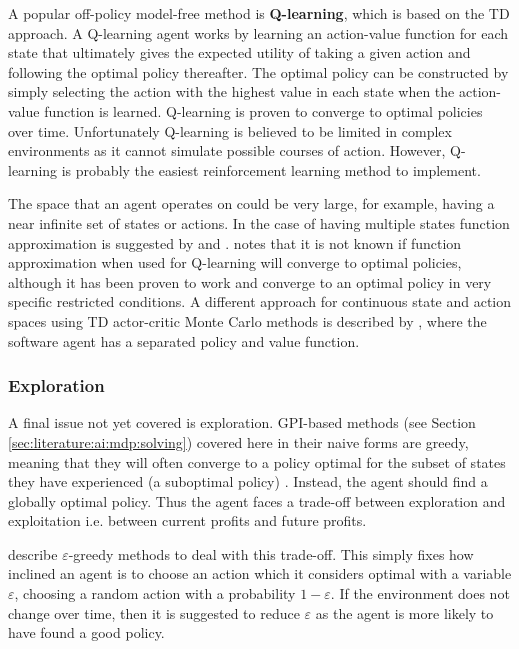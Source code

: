 A popular off-policy model-free method is \textbf{Q-learning}, which is based
on the TD approach. A Q-learning agent works by learning an action-value
function for each state that ultimately gives the expected utility of taking a
given action and following the optimal policy thereafter. The optimal policy
can be constructed by simply selecting the action with the highest value in
each state when the action-value function is learned. Q-learning is proven to
converge to optimal policies over time. Unfortunately Q-learning is believed to
be limited in complex environments as it cannot simulate possible courses of
action. However, Q-learning is probably the easiest reinforcement learning
method to implement. \parencite{Russell2010ai+modern}

The space that an agent operates on could be very large, for example, having a
near infinite set of states or actions. In the case of having multiple states
function approximation is suggested by \textcite{Sutton1998ai+reinforcement}
and \textcite{Russell2010ai+modern}. \textcite{Szepesvari2010ai+algorithms}
notes that it is not known if function approximation when used for Q-learning
will converge to optimal policies, although it has been proven to work and
converge to an optimal policy in very specific restricted conditions. A
different approach for continuous state and action spaces using TD actor-critic
Monte Carlo methods is described by \textcite{Lazaric2008ai+smc}, where the
software agent has a separated policy and value function.


\subsubsection{Exploration}
\label{sec:literature:ai:exploration}

A final issue not yet covered is exploration. GPI-based methods (see Section
\ref{sec:literature:ai:mdp:solving}) covered here in their naive forms are
greedy, meaning that they will often converge to a policy optimal for the
subset of states they have experienced (a suboptimal policy)
\parencite{Russell2010ai+modern}. Instead, the agent should find a globally
optimal policy. Thus the agent faces a trade-off between exploration and
exploitation i.e. between current profits and future profits.

\textcite{Sutton1998ai+reinforcement} describe \(\varepsilon\)-greedy methods
to deal with this trade-off. This simply fixes how inclined an agent is to
choose an action which it considers optimal with a variable \(\varepsilon\),
choosing a random action with a probability \(1 - \varepsilon\). If the
environment does not change over time, then it is suggested to reduce
\(\varepsilon\) as the agent is more likely to have found a good policy.

